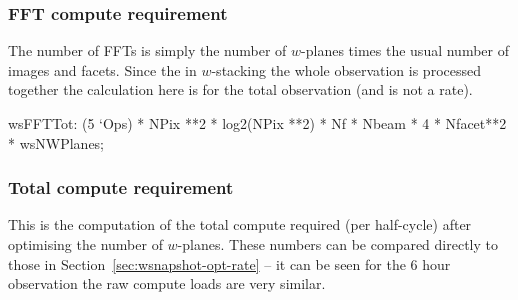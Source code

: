\documentclass[useAMS,usenatbib,referee]{article}
\begin{document}
\subsubsection{FFT compute requirement}

The number of FFTs is simply the number of $w$-planes times the usual
number of images and facets. Since the in $w$-stacking the whole
observation is processed together the calculation here is for the
total observation (and is not a rate).

\begin{maxima}[]
wsFFTTot: (5 `Ops) * NPix **2 * log2(NPix **2)  * Nf * Nbeam * 4 *
Nfacet**2 * wsNWPlanes;
\maximaoutput*
{}\; \\
\end{maxima}

\subsubsection{Total compute requirement}

This is the computation of the total compute required (per half-cycle)
after optimising the number of $w$-planes. These numbers can be
compared directly to those in Section~\ref{sec:wsnapshot-opt-rate} --
it can be seen for the 6 hour observation the raw compute loads are
very similar. 
\end{document}
